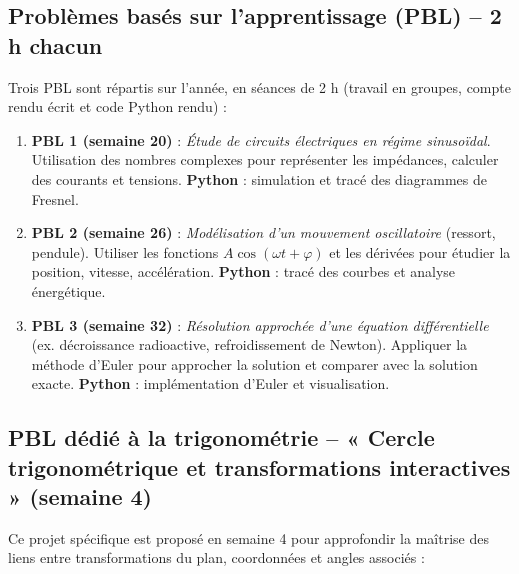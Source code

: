 \documentclass[a4paper,12pt]{article}
\begin{document}
	\subsection{Problèmes basés sur l’apprentissage (PBL) – 2 h chacun}
	Trois PBL sont répartis sur l’année, en séances de 2 h (travail en groupes, compte rendu écrit et code Python rendu) :
	
	\begin{enumerate}
		\item \textbf{PBL 1 (semaine 20)} : \emph{Étude de circuits électriques en régime sinusoïdal}. Utilisation des nombres complexes pour représenter les impédances, calculer des courants et tensions. \textbf{Python} : simulation et tracé des diagrammes de Fresnel.
		\item \textbf{PBL 2 (semaine 26)} : \emph{Modélisation d’un mouvement oscillatoire} (ressort, pendule). Utiliser les fonctions $A\cos(\omega t+\varphi)$ et les dérivées pour étudier la position, vitesse, accélération. \textbf{Python} : tracé des courbes et analyse énergétique.
		\item \textbf{PBL 3 (semaine 32)} : \emph{Résolution approchée d’une équation différentielle} (ex. décroissance radioactive, refroidissement de Newton). Appliquer la méthode d’Euler pour approcher la solution et comparer avec la solution exacte. \textbf{Python} : implémentation d’Euler et visualisation.
	\end{enumerate}
	
	\subsection{PBL dédié à la trigonométrie – « Cercle trigonométrique et transformations interactives » (semaine 4)}
	Ce projet spécifique est proposé en semaine 4 pour approfondir la maîtrise des liens entre transformations du plan, coordonnées et angles associés :
	
\end{document}
